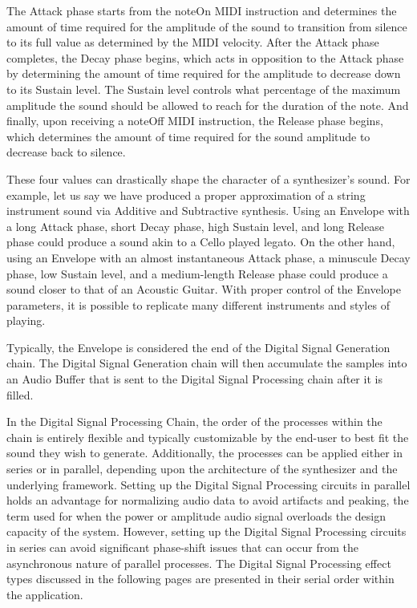 \documentclass[a4paper,12pt]{report}
\begin{document}
The Attack phase starts from the noteOn MIDI instruction and determines the amount of time required for the amplitude of the sound to transition from silence to its full value as determined by the MIDI velocity. After the Attack phase completes, the Decay phase begins, which acts in opposition to the Attack phase by determining the amount of time required for the amplitude to decrease down to its Sustain level. The Sustain level controls what percentage of the maximum amplitude the sound should be allowed to reach for the duration of the note. And finally, upon receiving a noteOff MIDI instruction, the Release phase begins, which determines the amount of time required for the sound amplitude to decrease back to silence.

These four values can drastically shape the character of a synthesizer's sound. For example, let us say we have produced a proper approximation of a string instrument sound via Additive and Subtractive synthesis. Using an Envelope with a long Attack phase, short Decay phase, high Sustain level, and long Release phase could produce a sound akin to a Cello played legato. On the other hand, using an Envelope with an almost instantaneous Attack phase, a minuscule Decay phase, low Sustain level, and a medium-length Release phase could produce a sound closer to that of an Acoustic Guitar. With proper control of the Envelope parameters, it is possible to replicate many different instruments and styles of playing.

Typically, the Envelope is considered the end of the Digital Signal Generation chain. The Digital Signal Generation chain will then accumulate the samples into an Audio Buffer that is sent to the Digital Signal Processing chain after it is filled.

In the Digital Signal Processing Chain, the order of the processes within the chain is entirely flexible and typically customizable by the end-user to best fit the sound they wish to generate. Additionally, the processes can be applied either in series or in parallel, depending upon the architecture of the synthesizer and the underlying framework. Setting up the Digital Signal Processing circuits in parallel holds an advantage for normalizing audio data to avoid artifacts and peaking, the term used for when the power or amplitude audio signal overloads the design capacity of the system. However, setting up the Digital Signal Processing circuits in series can avoid significant phase-shift issues that can occur from the asynchronous nature of parallel processes. The Digital Signal Processing effect types discussed in the following pages are presented in their serial order within the application.
\end{document}
